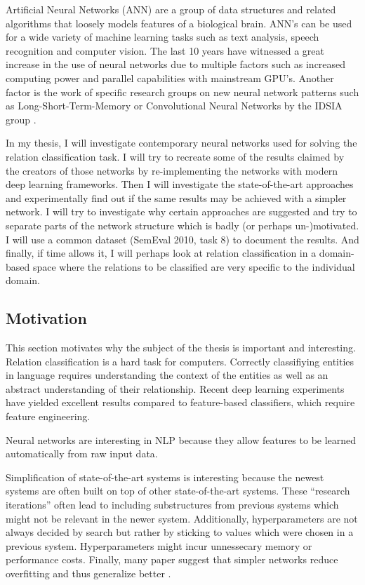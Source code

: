 \documentclass[12pt]{article}
\begin{document}
Artificial Neural Networks (ANN) are a group of data structures and related algorithms that loosely models features of a biological brain. ANN's can be used for a wide variety of machine learning tasks such as text analysis, speech recognition and computer vision. The last 10 years have witnessed a great increase in the use of neural networks due to multiple factors such as increased computing power and parallel capabilities with mainstream GPU's. Another factor is the work of specific research groups on new neural network patterns such as Long-Short-Term-Memory or Convolutional Neural Networks by the IDSIA group \cite{idsa}.

In my thesis, I will investigate contemporary neural networks used for solving the relation classification task. I will try to recreate some of the results claimed by the creators of those networks by re-implementing the networks with modern deep learning frameworks. Then I will investigate the state-of-the-art approaches and experimentally find out if the same results may be achieved with a simpler network. I will try to investigate why certain approaches are suggested and try to separate parts of the network structure which is badly (or perhaps un-)motivated. I will use a common dataset (SemEval 2010, task 8) to document the results. And finally, if time allows it, I will perhaps look at relation classification in a domain-based space where the relations to be classified are very specific to the individual domain. 

\subsection{Motivation}

This section motivates why the subject of the thesis is important and interesting.\\

Relation classification is a hard task for computers. Correctly classifiying entities in language requires understanding the context of the entities as well as an abstract understanding
of their relationship. Recent deep learning experiments have yielded excellent results compared to feature-based classifiers, which require feature engineering.   

Neural networks are interesting in NLP because they allow features to be learned automatically
from raw input data. 

Simplification of state-of-the-art systems is interesting because the newest systems are
often built on top of other state-of-the-art systems. These ``research iterations'' often
lead to including substructures from previous systems which might not be relevant in the newer system. Additionally, hyperparameters are not always decided by search but rather by sticking to values which were chosen in a previous system. Hyperparameters might incur unnessecary memory or performance costs. Finally, many paper suggest that simpler networks reduce overfitting and thus generalize better \cite{dropout} .  
\end{document}
